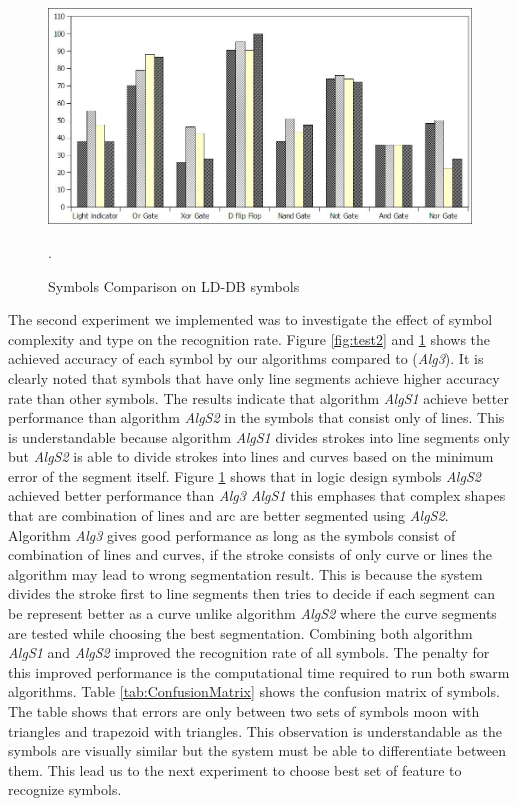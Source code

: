 \documentclass[preprint,10pt,5p,twocolumn]{elsarticle}
\begin{document}
\begin{figure}
	\centering
		\includegraphics[scale=0.5]{images/LDsymbols.jpg}
	\caption{Symbols Comparison on LD-DB symbols}.  %
	\label{fig:LDtest2}
\end{figure}  
The second experiment we implemented was to investigate the effect of symbol complexity and type on the recognition rate. Figure \ref{fig:test2} and \ref{fig:LDtest2} shows the achieved accuracy of each symbol by our algorithms compared to \cite{earlyprocess} (\textsl{Alg3}). It is clearly noted that symbols that have only line segments achieve higher accuracy rate than other symbols. The results indicate that algorithm \textsl{AlgS1} achieve better performance than algorithm \textsl{AlgS2} in the symbols that consist only of lines. This is understandable because algorithm \textsl{AlgS1} divides strokes into line segments only but \textsl{AlgS2} is able to divide strokes into lines and curves based on the minimum error of the segment itself. Figure \ref{fig:LDtest2} shows that in logic design symbols \textsl{AlgS2} achieved better performance than \textsl{Alg3} \textsl{AlgS1} this emphases that complex shapes that are combination of lines and arc are better segmented using \textsl{AlgS2}. Algorithm \textsl{Alg3} gives good performance as long as the symbols consist of combination of lines and curves, if the stroke consists of only curve or lines the algorithm may lead to wrong segmentation result. This is because the system divides the stroke first to line segments then tries to decide if each segment can be represent better as a curve unlike algorithm \textsl{AlgS2} where the curve segments are tested while choosing the best segmentation. Combining both algorithm \textsl{AlgS1} and \textsl{AlgS2} improved the recognition rate of all symbols. The penalty for this improved performance is the computational time required to run both swarm algorithms. Table \ref{tab:ConfusionMatrix} shows the confusion matrix of symbols. The table shows that errors are only between two sets of symbols moon with triangles and trapezoid with triangles. This observation is understandable as the symbols are visually similar but the system must be able to differentiate between them. This lead us to the next experiment to choose best set of feature to recognize symbols. 
\end{document}
